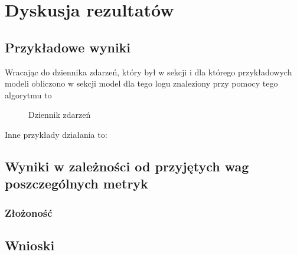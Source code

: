 \chapter{Dyskusja rezultatów}

\section{Przykładowe wyniki}
Wracając do dziennika zdarzeń, który był w sekcji i dla którego przykładowych modeli obliczono w sekcji model dla tego logu znaleziony przy pomocy tego algorytmu to 
\begin{figure}[!ht]
	\caption{\label{fig:flow_chart}Dziennik zdarzeń}
\end{figure}

Inne przykłady działania to: 

\section{Wyniki w zależności od przyjętych wag poszczególnych metryk}

\subsection{Złożoność}

\section{Wnioski}
